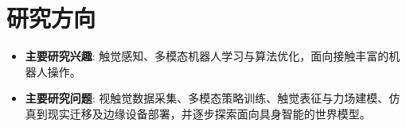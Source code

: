
\section{研究方向}

\begin{itemize}
\cvprojectbodyfont
    \item \textbf{主要研究兴趣}: 触觉感知、多模态机器人学习与算法优化，面向接触丰富的机器人操作。
\end{itemize}

\begin{itemize}
\cvprojectbodyfont
    \item \textbf{主要研究问题}: 视触觉数据采集、多模态策略训练、触觉表征与力场建模、仿真到现实迁移及边缘设备部署，并逐步探索面向具身智能的世界模型。
\end{itemize}
